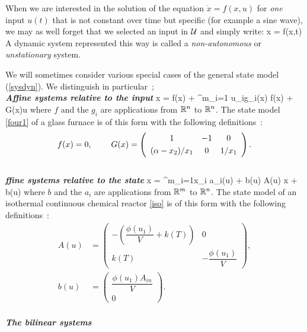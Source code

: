 When we are interested in the solution of the equation $\dot x = f(x,u)$ for
{\em one} input $u(t)$ that is not constant over time but specific (for
example a sine wave), we may as well forget that we
selected an input in ${\cal U}$ and simply write:
\eqnn
\dot x = f(x,t)
\eeqnn
A dynamic system represented this way is called a {\em  non-autonomous} or {\em unstationary} system. 

We will sometimes consider various special cases of the
general state model (\ref{sysdyn}). We distinguish in particular~;\\

\noindent \textbf{\textit{Affine systems relative to the input}}
\eqnn
\dot x = f(x) + \sum^m_{i=1} u_ig_i(x) \triangleq f(x) + G(x)u
\eeqnn
where $f$ and the $g_i$ are applications from $\mathbb{R}^n$ to $\mathbb{R}^n$.
The state model \eqref{four1} of a glass furnace is of this form with the following definitions~:
\begin{equation*}
f(x) = 0, \hh \hh \hh \hh G(x) = \left(\begin{array}{ccc}
1&-1 & 0 \\[0.3em] (\alpha-x_2)/x_1 & 0 & 1/x_1 \end{array} \right).
\end{equation*}\\

\noindent \textbf{\textit{ffine systems relative to the state}}
\eqnn
\dot x = \sum^m_{i=1}x_i a_i(u) + b(u) \triangleq A(u) x + b(u) 
\eeqnn
where $b$ and the $a_i$ are applications from $\mathbb{R}^m$ to $\mathbb{R}^n$. The state model of an isothermal continuous chemical reactor \eqref{iso} is of this form with the following definitions~:
\begin{equation*} \begin{split}
A(u) &= \left(\begin{array}{cc}
-(\dfrac{\phi(u_1)}{V} +k(T)) & 0 \\[0.3em] k(T) & -\dfrac{ \phi(u_1)}{V}
\end{array} \right),\\[0.5em]
b(u) &=  \left(\begin{array}{c} \dfrac{ \phi(u_1) A_{in}}{V}\\[0.7em] 0
\end{array}\right).
\end{split} \end{equation*}\\

\noindent \textbf{\textit{The bilinear systems}}
 
